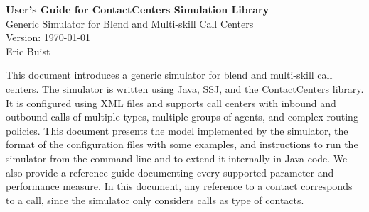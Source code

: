 \documentclass[twoside, 12pt]{article}
\begin{document}
\begin{titlepage}
\null\vfill
\begin{center}
  {\Large\bf User's Guide for ContactCenters Simulation Library }\\[20pt]
  {\Large Generic Simulator for Blend and Multi-skill Call Centers} \\[20pt]
 Version: \today \\
\vfill
 {\sc Eric Buist}
\vfill
\end{center}

\vfill
This document introduces a generic
simulator for
blend and multi-skill
call centers.  The simulator is written
using Java, SSJ, and the ContactCenters library.
It is configured using
XML files and supports call centers with
inbound and outbound calls of multiple types,
multiple groups of agents, and complex routing policies.
This document presents the model implemented by the
simulator,
the format of the configuration files with some examples,
and instructions to
run the simulator from the command-line and to extend it internally in
Java code.
We also provide a reference guide documenting every supported
parameter and performance measure.
In this document, any reference to a contact corresponds to a call,
since the simulator only considers calls as type of contacts.
\end{titlepage}
\tableofcontents
\clearpage\listoftables
\clearpage\listoffigures
\clearpage\lstlistoflistings
{}










\makeatletter
\def\@xmlconfigclssection{\@startsection{subsection}%
   {2}{0mm}{-\baselineskip}{0.5\baselineskip}%
   {\large\bfseries}}
\makeatother




% 
% 
% 
% 
% 

% 
% 

\end{document}
